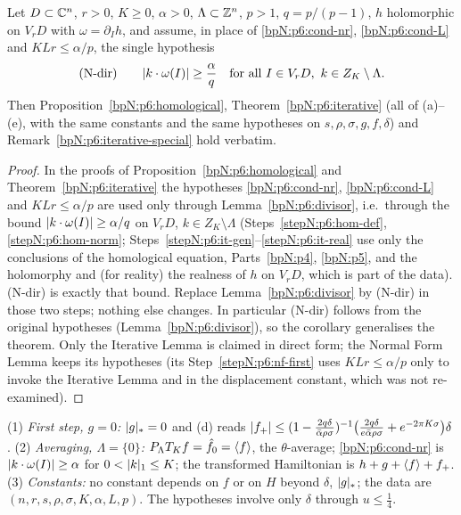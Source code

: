 \begin{corollary}\label{bpN:p6:iterative-direct}
Let $D\subset\mathbb{C}^n$, $r>0$, $K\ge0$, $\alpha>0$, $\Lambda\subset\mathbb{Z}^n$, $p>1$, $q=p/(p-1)$, $h$ holomorphic on $V_rD$ with $\omega=\partial_Ih$, and assume, in place of \ref{bpN:p6:cond-nr}, \ref{bpN:p6:cond-L} and $KLr\le\alpha/p$, the single hypothesis
\[\textup{(N-dir)}\qquad\lvert k\cdot\omega(I)\rvert\ge\frac\alpha q\quad\text{for all }I\in V_rD,\ k\in Z_K\setminus\Lambda .\]
Then Proposition~\ref{bpN:p6:homological}, Theorem~\ref{bpN:p6:iterative} (all of (a)--(e), with the same constants and the same hypotheses on $s,\rho,\sigma,g,f,\delta$) and Remark~\ref{bpN:p6:iterative-special} hold verbatim.
\end{corollary}
\begin{proof}
\label{stepN:p6:dir-use} In the proofs of Proposition~\ref{bpN:p6:homological} and Theorem~\ref{bpN:p6:iterative} the hypotheses \ref{bpN:p6:cond-nr}, \ref{bpN:p6:cond-L} and $KLr\le\alpha/p$ are used only through Lemma~\ref{bpN:p6:divisor}, i.e.\ through the bound $\lvert k\cdot\omega(I)\rvert\ge\alpha/q$ on $V_rD$, $k\in Z_K\setminus\Lambda$ (Steps~\ref{stepN:p6:hom-def}, \ref{stepN:p6:hom-norm}; Steps~\ref{stepN:p6:it-gen}--\ref{stepN:p6:it-real} use only the conclusions of the homological equation, Parts~\ref{bpN:p4}, \ref{bpN:p5}, and the holomorphy and (for reality) the realness of $h$ on $V_rD$, which is part of the data). \textup{(N-dir)} is exactly that bound.
\label{stepN:p6:dir-concl} Replace Lemma~\ref{bpN:p6:divisor} by \textup{(N-dir)} in those two steps; nothing else changes. In particular \textup{(N-dir)} follows from the original hypotheses (Lemma~\ref{bpN:p6:divisor}), so the corollary generalises the theorem. Only the Iterative Lemma is claimed in direct form; the Normal Form Lemma keeps its hypotheses (its Step~\ref{stepN:p6:nf-first} uses $KLr\le\alpha/p$ only to invoke the Iterative Lemma and in the displacement constant, which was not re-examined).
\end{proof}

\begin{remark}\label{bpN:p6:iterative-special}
(1) \emph{First step, $g=0$:} $\lvert g\rvert_*=0$ and (d) reads $\lvert f_+\rvert\le(1-\frac{2q\delta}{\bar\alpha\rho\sigma})^{-1}\bigl(\frac{2q\delta}{e\bar\alpha\rho\sigma}+e^{-2\pi K\sigma}\bigr)\delta$.
(2) \emph{Averaging, $\Lambda=\{0\}$:} $P_\Lambda T_Kf=\hat f_0=\langle f\rangle$, the $\theta$-average; \ref{bpN:p6:cond-nr} is $\lvert k\cdot\omega(I)\rvert\ge\alpha$ for $0<\lvert k\rvert_1\le K$; the transformed Hamiltonian is $h+g+\langle f\rangle+f_+$.
(3) \emph{Constants:} no constant depends on $f$ or on $H$ beyond $\delta$, $\lvert g\rvert_*$; the data are $(n,r,s,\rho,\sigma,K,\alpha,L,p)$. The hypotheses involve only $\delta$ through $u\le\frac14$.
\end{remark}

